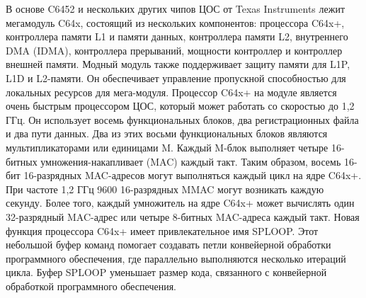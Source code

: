 В основе C6452 и нескольких других чипов ЦОС от Texas Instruments лежит мегамодуль C64x, состоящий из нескольких компонентов: процессора C64x+, контроллера памяти L1 и памяти данных, контроллера памяти L2, внутреннего DMA (IDMA), контроллера прерываний, мощности контроллер и контроллер внешней памяти. Модный модуль также поддерживает защиту памяти для L1P, L1D и L2-памяти. Он обеспечивает управление пропускной способностью для локальных ресурсов для мега-модуля. 
Процессор C64x+ на модуле является очень быстрым процессором
 ЦОС, который может работать со скоростью до 1,2 ГГц. Он использует восемь функциональных блоков, два регистрационных файла и два пути данных. Два из этих восьми функциональных блоков являются мультипликаторами или единицами M. Каждый M-блок выполняет четыре 16-битных умножения-накапливает (MAC) каждый такт. 
Таким образом, восемь 16-бит 16-разрядных MAC-адресов могут выполняться каждый цикл на ядре C64x+. При частоте 1,2 ГГц 9600 16-разрядных MMAC могут возникать каждую секунду. Более того, каждый умножитель на ядре C64x+ может вычислять один 32-разрядный MAC-адрес или четыре 8-битных MAC-адреса каждый такт. 
Новая функция процессора C64x+ имеет привлекательное имя SPLOOP. Этот небольшой буфер команд помогает создавать петли конвейерной обработки программного обеспечения, где параллельно выполняются несколько итераций цикла. Буфер SPLOOP уменьшает размер кода, связанного с конвейерной обработкой программного обеспечения.
